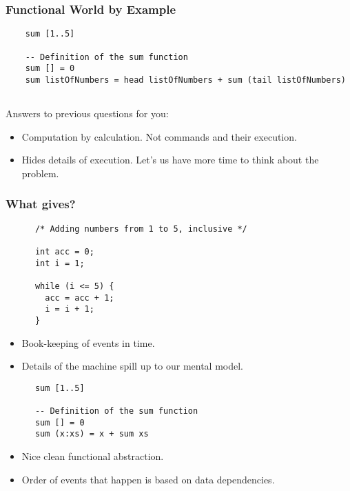 \documentclass{beamer}
\begin{document}
\begin{frame}[fragile,t]
  \frametitle{Functional World by Example}
    
  \begin{verbatim}
    sum [1..5]

    -- Definition of the sum function
    sum [] = 0
    sum listOfNumbers = head listOfNumbers + sum (tail listOfNumbers)
    
  \end{verbatim}

  Answers to previous questions for you:
  \begin{itemize}
  \item Computation by calculation. Not commands and their execution.
  \item Hides details of execution. Let's us have more time to think about the problem.
  \end{itemize}
  
\end{frame}

\begin{frame}[fragile,t]
  \frametitle{What gives?}
  
  \begin{multicols}{2}

    \begin{verbatim}
      /* Adding numbers from 1 to 5, inclusive */
      
      int acc = 0;
      int i = 1;

      while (i <= 5) {
        acc = acc + 1;
        i = i + 1;
      }
    \end{verbatim}

    \begin{itemize}
    \item Book-keeping of events in time.
    \item Details of the machine spill up to our mental model.
    \end{itemize}

    \columnbreak
    
    \begin{verbatim}
      sum [1..5]
      
      -- Definition of the sum function
      sum [] = 0
      sum (x:xs) = x + sum xs
    \end{verbatim}

    \begin{itemize}
    \item Nice clean functional abstraction.
    \item Order of events that happen is based on data dependencies.
    \end{itemize}
    
  \end{multicols}

\end{frame}
\end{document}
